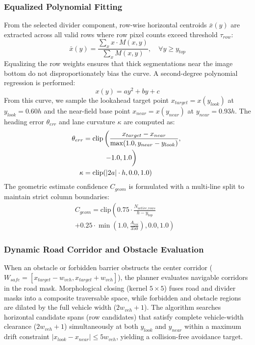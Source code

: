 \documentclass[conference]{IEEEtran}
\begin{document}
\subsubsection{Equalized Polynomial Fitting}
From the selected divider component, row-wise horizontal centroids $\bar{x}(y)$ are extracted across all valid rows where row pixel counts exceed threshold $\tau_{row}$:
\begin{equation}
    \bar{x}(y) = \frac{\sum_{x} x \cdot M(x,y)}{\sum_{x} M(x,y)}, \quad \forall y \ge y_{top}
\end{equation}
Equalizing the row weights ensures that thick segmentations near the image bottom do not disproportionately bias the curve. A second-degree polynomial regression is performed:
\begin{equation}
    x(y) = a y^2 + b y + c
\end{equation}
From this curve, we sample the lookahead target point $x_{target} = x(y_{look})$ at $y_{look} = 0.60 h$ and the near-field base point $x_{near} = x(y_{near})$ at $y_{near} = 0.93 h$. The heading error $\theta_{err}$ and lane curvature $\kappa$ are computed as:
\begin{align}
    \theta_{err} & = \text{clip}\left(\frac{x_{target} - x_{near}}{\max(1.0, y_{near} - y_{look})}, \right. \nonumber \\
                 & \quad\quad\quad \left. -1.0, 1.0\vphantom{\frac{1}{1}}\right)                                      \\
    \kappa       & = \text{clip}(|2a| \cdot h, 0.0, 1.0)
\end{align}
The geometric estimate confidence $C_{geom}$ is formulated with a multi-line split to maintain strict column boundaries:
\begin{equation}
    \begin{split}
        C_{geom} = \text{clip}\left(0.75 \cdot \frac{N_{active\_rows}}{h - y_{top}} \right. & \\
        + \left. 0.25 \cdot \min\left(1.0, \frac{A_{roi}}{350}\right), 0.0, 1.0\right) &
    \end{split}
\end{equation}

\subsubsection{Dynamic Road Corridor and Obstacle Evaluation}
When an obstacle or forbidden barrier obstructs the center corridor ($W_{safe} = [x_{target} - w_{veh}, x_{target} + w_{veh}]$), the planner evaluates navigable corridors in the road mask.
Morphological closing ($\text{kernel } 5 \times 5$) fuses road and divider masks into a composite traversable space, while forbidden and obstacle regions are dilated by the full vehicle width ($2 w_{veh} + 1$). The algorithm searches horizontal candidate spans (row candidates) that satisfy complete vehicle-width clearance ($2 w_{veh} + 1$) simultaneously at both $y_{look}$ and $y_{near}$ within a maximum drift constraint $|x_{look} - x_{near}| \le 5 w_{veh}$, yielding a collision-free avoidance target.
\end{document}
